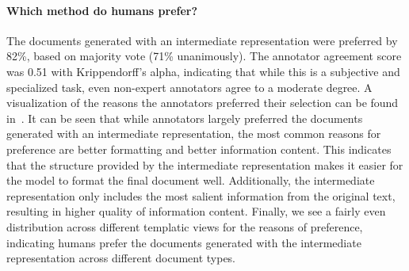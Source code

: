 \paragraph{Which method do humans prefer?} The documents generated with an intermediate representation were preferred by 82\%, based on majority vote (71\% unanimously). The annotator agreement score was 0.51 with Krippendorff's alpha, indicating that while this is a subjective and specialized task, even non-expert annotators agree to a moderate degree. 
A visualization of the reasons the annotators preferred their selection can be found in~. 
It can be seen that while annotators largely preferred the documents generated with an intermediate representation, the most common reasons for preference are better formatting and better information content. This indicates that the structure provided by the intermediate representation makes it easier for the model to format the final document well. Additionally, the intermediate representation only includes the most salient information from the original text, resulting in higher quality of information content. Finally, we see a fairly even distribution across different templatic views for the reasons of preference, indicating humans prefer the documents generated with the intermediate representation across different document types.

% 



